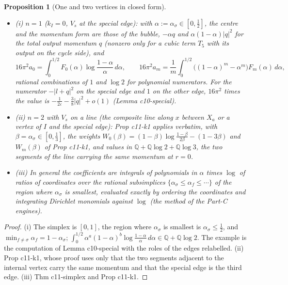 \documentclass[11pt]{article}
\numberwithin{equation}{section}
\theoremstyle{plain}
\newtheorem{proposition}[theorem]{Proposition}
\theoremstyle{definition}
\begin{document}
\begin{proposition}[One and two vertices in closed form]
\label{prop:qs-small}
\begin{itemize}
\item (i) $n=1$ ($k_I=0$, $V_s$ at the special edge): with $\alpha:=\alpha_\sigma\in[0,\tfrac12]$, the centre and the momentum form are those of the bubble, $-\alpha q$ and $\alpha(1-\alpha)|q|^2$ for the total output momentum $q$ (nonzero only for a cubic term $T_5$ with its output on the cycle side), and
\[
16\pi^2a_0=\int_0^{1/2}F_0(\alpha)\log\frac{1-\alpha}\alpha\,d\alpha,\qquad 16\pi^2a_m=\frac1m\int_0^{1/2}\big((1-\alpha)^m-\alpha^m\big)F_m(\alpha)\,d\alpha ,
\]
rational combinations of $1$ and $\log2$ for polynomial numerators. For the numerator $-|l+q|^2$ on the special edge and $1$ on the other edge, $16\pi^2$ times the value is $-\frac1{2\varepsilon}-\frac38|q|^2+o(1)$ (Lemma c10-special).
\item (ii) $n=2$ with $V_s$ on a line (the composite line along $x$ between $X_a$ or a vertex of $I$ and the special edge): Prop c11-k1 applies verbatim, with $\beta=\alpha_\sigma\in[0,\tfrac13]$, the weights $W_0(\beta)=(1-\beta)\log\frac{1-\beta}{2\beta}-(1-3\beta)$ and $W_m(\beta)$ of Prop c11-k1, and values in $\mathbb Q+\mathbb Q\log2+\mathbb Q\log3$, the two segments of the line carrying the same momentum at $r=0$.
\item (iii) In general the coefficients are integrals of polynomials in $\alpha$ times $\log$ of ratios of coordinates over the rational subsimplices $\{\alpha_\sigma\le\alpha_f\le\cdots\}$ of the region where $\alpha_\sigma$ is smallest, evaluated exactly by ordering the coordinates and integrating Dirichlet monomials against $\log$ (the method of the Part-C engines).
\end{itemize}
\end{proposition}

\begin{proof}
(i) The simplex is $[0,1]$, the region where $\alpha_\sigma$ is smallest is $\alpha_\sigma\le\tfrac12$, and $\min_{f\ne\sigma}\alpha_f=1-\alpha_\sigma$; $\int_0^{1/2}\alpha^a(1-\alpha)^b\log\frac{1-\alpha}\alpha\,d\alpha\in\mathbb Q+\mathbb Q\log2$. The example is the computation of Lemma c10-special with the roles of the edges relabelled. (ii) Prop c11-k1, whose proof uses only that the two segments adjacent to the internal vertex carry the same momentum and that the special edge is the third edge. (iii) Thm c11-simplex and Prop c11-k1.
\end{proof}
\end{document}
